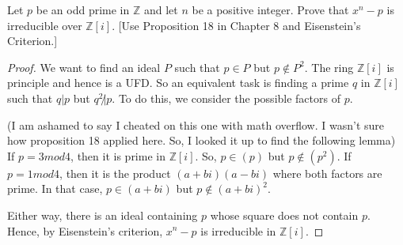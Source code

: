 \documentclass[10pt]{article}
\newenvironment{problem}[2][Problem]{\begin{trivlist}
		\item[\hskip \labelsep {\bfseries #1}\hskip \labelsep {\bfseries #2.}]}{\end{trivlist}}
\begin{document}
	\begin{problem}{5.3}
		Let $p$ be an odd prime in $\mathbb{Z}$ and let $n$ be a positive integer. Prove that $x^n - p$ is irreducible
		over $\mathbb{Z}[i]$. [Use Proposition 18 in Chapter 8 and Eisenstein's Criterion.]
		\begin{proof}
			We want to find an ideal $P$ such that $p\in P$ but $p \not \in P^2$. The ring $\mathbb{Z}[i]$ is principle and hence is a UFD. So an equivalent task is finding a prime $q$ in $\mathbb{Z}[i]$ such that $q|p$ but $q^2 \not | p$. To do this, we consider the possible factors of $p$.
			
			(I am ashamed to say I cheated on this one with math overflow. I wasn't sure how proposition 18 applied here. So, I looked it up to find the following lemma)
			If $p = 3mod4$, then it is prime in $\mathbb{Z}[i]$. So, $p \in (p)$ but $p \not \in (p^2)$. If $p = 1mod4$, then it is the product $(a+bi)(a-bi)$ where both factors are prime. In that case, $p \in (a+bi)$ but $p \not \in (a+bi)^2$. 
			
			Either way, there is an ideal containing $p$ whose square does not contain $p$. Hence, by Eisenstein's criterion, $x^n - p$ is irreducible in $\mathbb{Z}[i]$.
		\end{proof}
	\end{problem}
	
\end{document}
